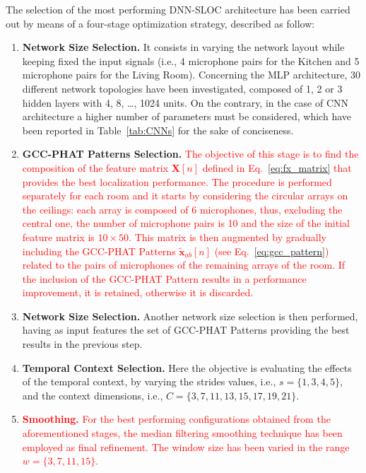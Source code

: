 \documentclass[review]{elsarticle}
\newcommand{\tableref}[1]{Table~\ref{#1}}
\let\originaleqref=\eqref
\renewcommand{\eqref}{Eq.~\originaleqref}
\begin{document}
The selection of the most performing DNN-SLOC architecture has been carried out by means of a four-stage optimization strategy, described as follow:

\begin{enumerate}
	\item{\textbf{Network Size Selection.}}  It consists in varying the network layout while keeping fixed the input signals (i.e., 4 microphone pairs for the Kitchen and 5 microphone pairs for the Living Room). 
	Concerning the MLP architecture, 30 different network topologies have been investigated, composed of 1, 2 or 3 hidden layers with 4, 8, \dots, 1024 units. 
	On the contrary, in the case of CNN architecture a higher number of parameters must be considered, which have been reported in \tableref{tab:CNNs} for the sake of conciseness. 
	\item{\textbf{GCC-PHAT Patterns Selection.}} \textcolor{red}{The objective of this stage is to find the composition of the feature matrix $\mathbf{X}[n]$ defined in \eqref{eq:fx_matrix} that provides the best localization performance. The procedure is performed separately for each room and it starts by considering the circular arrays on the ceilings: each array is composed of 6 microphones, thus, excluding the central one, the number of microphone pairs is 10 and the size of the initial feature matrix is $10 \times 50$. This matrix is then augmented by gradually including the GCC-PHAT Patterns $\mathbf{\tilde{x}}_{ab}[n]$ (see \eqref{eq:gcc_pattern}) related to the pairs of microphones of the remaining arrays of the room. If the inclusion of the GCC-PHAT Pattern results in a performance improvement, it is retained, otherwise it is discarded.}
	
	\item{\textbf{Network Size Selection.}} Another network size selection is then performed, having as input features the set of GCC-PHAT Patterns providing the best results in the previous step. 
	\item{\textbf{Temporal Context Selection.}} Here the objective is evaluating the effects of the temporal context, by varying the strides values, i.e., $s=\{1,3,4,5\}$, and the context dimensions, i.e., $C=\{3,7,11,13,15,17,19,21\}$.
	
	\item \textcolor{red}{{\textbf{Smoothing.}} For the best performing configurations obtained from the aforementioned stages, the median filtering smoothing technique has been employed as final refinement. The window size has been varied in the range $w=\{3,7,11,15\}$.}
\end{enumerate}
\end{document}
